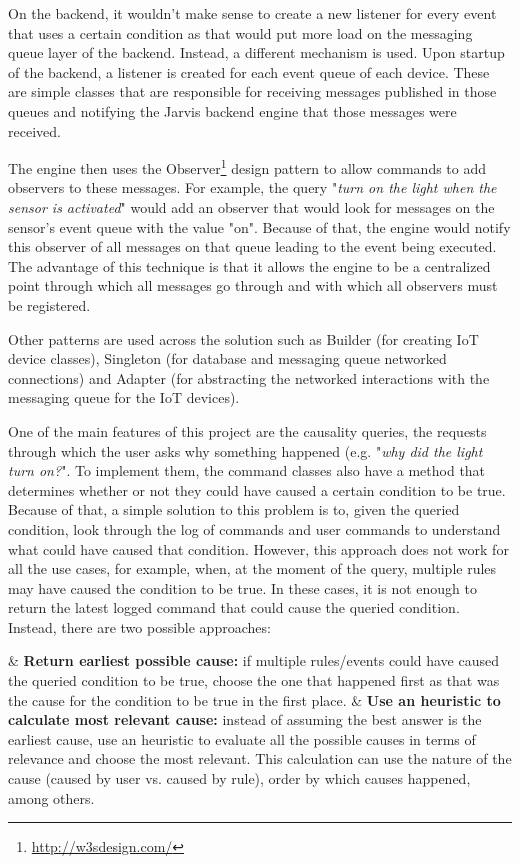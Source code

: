 \documentclass[runningheads]{llncs}
\begin{document}
On the backend, it wouldn't make sense to create a new listener for every event that uses a certain condition as that would put more load on the messaging queue layer of the backend. Instead, a different mechanism is used. Upon startup of the backend, a listener is created for each event queue of each device. These are simple classes that are responsible for receiving messages published in those queues and notifying the Jarvis backend engine that those messages were received.

The engine then uses the Observer\footnote{\url{http://w3sdesign.com/}} design pattern to allow commands to add observers to these messages. For example, the query "\textit{turn on the light when the sensor is activated}" would add an observer that would look for messages on the sensor's event queue with the value "on". Because of that, the engine would notify this observer of all messages on that queue leading to the event being executed. The advantage of this technique is that it allows the engine to be a centralized point through which all messages go through and with which all observers must be registered.

Other patterns are used across the solution such as Builder (for creating IoT device classes), Singleton (for database and messaging queue networked connections) and Adapter (for abstracting the networked interactions with the messaging queue for the IoT devices).

One of the main features of this project are the causality queries, the requests through which the user asks why something happened (e.g. "\textit{why did the light turn on?}". To implement them, the command classes also have a method that determines whether or not they could have caused a certain condition to be true. Because of that, a simple solution to this problem is to, given the queried condition, look through the log of commands and user commands to understand what could have caused that condition. However, this approach does not work for all the use cases, for example, when, at the moment of the query, multiple rules may have caused the condition to be true. In these cases, it is not enough to return the latest logged command that could cause the queried condition. Instead, there are two possible approaches:

\begin{easylist}[itemize]
  & \textbf{Return earliest possible cause:} if multiple rules/events could have caused the queried condition to be true, choose the one that happened first as that was the cause for the condition to be true in the first place.
  & \textbf{Use an heuristic to calculate most relevant cause:} instead of assuming the best answer is the earliest cause, use an heuristic to evaluate all the possible causes in terms of relevance and choose the most relevant. This calculation can use the nature of the cause (caused by user vs. caused by rule), order by which causes happened, among others.
\end{easylist}
\end{document}
